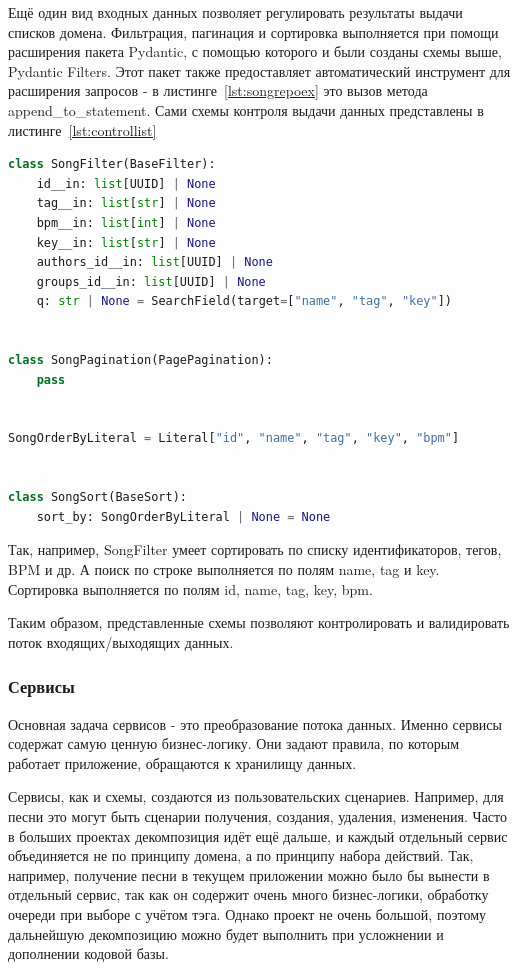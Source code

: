 \documentclass[14pt]{extarticle}
\begin{document}
Ещё один вид входных данных позволяет регулировать результаты выдачи списков домена. Фильтрация, пагинация и сортировка выполняется при помощи расширения
пакета Pydantic, с помощью которого и были созданы схемы выше, Pydantic Filters. Этот пакет также предоставляет автоматический инструмент для расширения
запросов - в листинге~\ref{lst:songrepoex} это вызов метода append\_to\_statement. Сами схемы контроля выдачи данных представлены в листинге~\ref{lst:controllist}
\begin{lstlisting}[caption={Оркестрирующая схема ответа}, label={lst:controllist}, language=Python]
class SongFilter(BaseFilter):
    id__in: list[UUID] | None
    tag__in: list[str] | None
    bpm__in: list[int] | None
    key__in: list[str] | None
    authors_id__in: list[UUID] | None
    groups_id__in: list[UUID] | None
    q: str | None = SearchField(target=["name", "tag", "key"])


class SongPagination(PagePagination):
    pass


SongOrderByLiteral = Literal["id", "name", "tag", "key", "bpm"]


class SongSort(BaseSort):
    sort_by: SongOrderByLiteral | None = None
\end{lstlisting}

Так, например, SongFilter умеет сортировать по списку идентификаторов, тегов, BPM и др. А поиск по строке выполняется по полям name, tag и key. Сортировка
выполняется по полям id, name, tag, key, bpm.

Таким образом, представленные схемы позволяют контролировать и валидировать поток входящих/выходящих данных.

\subsubsection{Сервисы}

Основная задача сервисов - это преобразование потока данных. Именно сервисы содержат самую ценную бизнес-логику. Они задают правила, 
по которым работает приложение, обращаются к хранилищу данных.

Сервисы, как и схемы, создаются из пользовательских сценариев. Например, для песни это могут быть сценарии получения, создания, 
удаления, изменения. Часто в больших проектах декомпозиция идёт ещё дальше, и каждый отдельный сервис объединяется не по принципу
домена, а по принципу набора действий. Так, например, получение песни в текущем приложении можно было бы вынести в отдельный сервис, 
так как он содержит очень много бизнес-логики, обработку очереди при выборе с учётом тэга. Однако проект не очень большой, 
поэтому дальнейшую декомпозицию можно будет выполнить при усложнении и дополнении кодовой базы.
\end{document}
